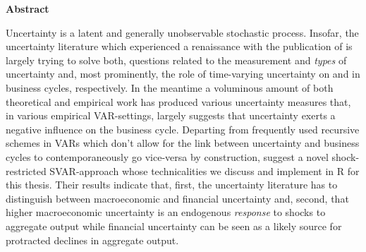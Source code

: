 \documentclass[a4paper,11pt,listof=nochaptergap,oneside,pointednumbers,bibtotoc,bigheadings,liststotoc,hidelinks]{scrbook}
\makeatletter
\theoremstyle{mysatz}
\theoremstyle{mydefinition}
\theoremstyle{mytheorem}
\theoremstyle{mybemerkung}
\newcommand\abstractname{Abstract}  %
\newenvironment{abstract}{%
      \titlepage
      \null\vfil
      \@beginparpenalty\@lowpenalty
      \begin{center}%
        \bfseries \abstractname
        \@endparpenalty\@M
      \end{center}}%
     {\par\vfil\null\endtitlepage}
\newenvironment{abstract}{%
      \if@twocolumn
        \section*{\abstractname}%
      \else
        \small
        \begin{center}%
          {\bfseries \abstractname\vspace{-.5em}\vspace{\z@}}%
        \end{center}%
        \quotation
      \fi}
      {\if@twocolumn\else\endquotation\fi}
\makeatother
\begin{document}
\thispagestyle{empty} 
\begin{abstract}
Uncertainty is a latent and generally unobservable stochastic process. Insofar, the uncertainty literature which experienced a renaissance with the publication of \citet{bloom:09} is largely trying to solve both, questions related to the measurement and \textit{types} of uncertainty and, most prominently, the role of time-varying uncertainty on and in business cycles, respectively. In the meantime a voluminous amount of both theoretical and empirical work has produced various uncertainty measures that, in various empirical VAR-settings, largely suggests that uncertainty exerts a negative influence on the business cycle. Departing from frequently used recursive schemes in VARs which don't allow for the link between uncertainty and business cycles to contemporaneously go vice-versa by construction, \citep{ludvigsonetal:18, ludvigsonetal:19} suggest a novel shock-restricted SVAR-approach whose technicalities we discuss and implement in R for this thesis. Their results indicate that, first, the uncertainty literature has to distinguish between macroeconomic and financial uncertainty and, second, that higher macroeconomic uncertainty is an endogenous \textit{response} to shocks to aggregate output while financial uncertainty can be seen as a likely source for protracted declines in aggregate output.
\end{abstract}
\end{document}
